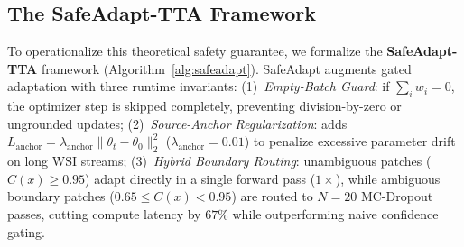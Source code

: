 \documentclass[conference]{IEEEtran}
\begin{document}
\subsection{The SafeAdapt-TTA Framework}
\label{sec:safeadapt}
To operationalize this theoretical safety guarantee, we formalize the \textbf{SafeAdapt-TTA} framework (Algorithm~\ref{alg:safeadapt}). SafeAdapt augments gated adaptation with three runtime invariants:
(1)~\emph{Empty-Batch Guard}: if $\sum_i w_i = 0$, the optimizer step is skipped completely, preventing division-by-zero or ungrounded updates;
(2)~\emph{Source-Anchor Regularization}: adds $L_{\text{anchor}} = \lambda_{\text{anchor}} \|\theta_t - \theta_0\|_2^2$ ($\lambda_{\text{anchor}} = 0.01$) to penalize excessive parameter drift on long WSI streams;
(3)~\emph{Hybrid Boundary Routing}: unambiguous patches ($C(x) \ge 0.95$) adapt directly in a single forward pass ($1\times$), while ambiguous boundary patches ($0.65 \le C(x) < 0.95$) are routed to $N=20$ MC-Dropout passes, cutting compute latency by $67\%$ while outperforming naive confidence gating.
\end{document}
